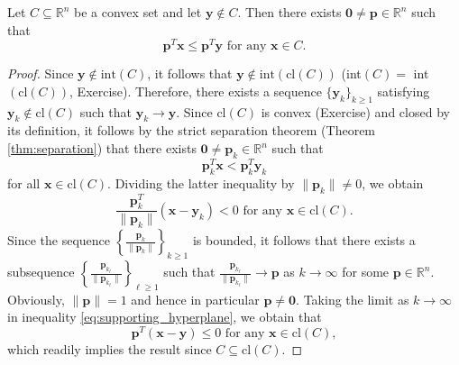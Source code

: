 \documentclass[10pt,a4paper]{article}
\begin{document}
\begin{theorem}\label{thm:supporting_hyperplane}
	Let $C \subseteq \mathbb{R}^n$ be a convex set and let $\mathbf{y} \notin C$. Then there exists $\mathbf{0} \neq \mathbf{p} \in \mathbb{R}^n$ such that
	\begin{equation*}
		\mathbf{p}^T \mathbf{x} \leq \mathbf{p}^T \mathbf{y} \text{ for any } \mathbf{x} \in C.
	\end{equation*}
\end{theorem}

\begin{proof}
	Since $\mathbf{y} \notin \text{int}(C)$, it follows that $\mathbf{y} \notin \text{int}(\text{cl}(C))$ (int$(C) = $ int$(\text{cl}(C))$, Exercise). Therefore, there exists a sequence $\{\mathbf{y}_k\}_{k \geq 1}$ satisfying $\mathbf{y}_k \notin \text{cl}(C)$
	such that $\mathbf{y}_k \to \mathbf{y}$. Since $\text{cl}(C)$ is convex (Exercise) and closed by its definition,
	it follows by the strict separation theorem (Theorem \ref{thm:separation}) that there exists $\mathbf{0} \neq \mathbf{p}_k \in \mathbb{R}^n$
	such that
	\begin{equation*}
		\mathbf{p}_k^T \mathbf{x} < \mathbf{p}_k^T \mathbf{y}_k
	\end{equation*}
	for all $\mathbf{x} \in \text{cl}(C)$. Dividing the latter inequality by $\|\mathbf{p}_k\| \neq 0$, we obtain
	\begin{equation}\label{eq:supporting_hyperplane}
		\frac{\mathbf{p}_k^T}{\|\mathbf{p}_k\|}(\mathbf{x} - \mathbf{y}_k) < 0 \text{ for any } \mathbf{x} \in \text{cl}(C).
	\end{equation}
	Since the sequence $\left\{ \frac{\mathbf{p}_k}{\|\mathbf{p}_k\|} \right\}_{k \geq 1}$ is bounded, it follows that there exists a subsequence $\left\{ \frac{\mathbf{p}_{k_\ell}}{\|\mathbf{p}_{k_\ell}\|} \right\}_{\ell \geq 1}$
	such that $\frac{\mathbf{p}_{k_\ell}}{\|\mathbf{p}_{k_\ell}\|} \to \mathbf{p}$ as $k \to \infty$ for some $\mathbf{p} \in \mathbb{R}^n$. Obviously, $\|\mathbf{p}\| = 1$ and hence in particular $\mathbf{p} \neq \mathbf{0}$. Taking the limit as $k \to \infty$ in inequality \eqref{eq:supporting_hyperplane}, we obtain that
	\begin{equation*}
		\mathbf{p}^T(\mathbf{x} - \mathbf{y}) \leq 0 \text{ for any } \mathbf{x} \in \text{cl}(C),
	\end{equation*}
	which readily implies the result since $C \subseteq \text{cl}(C)$.
\end{proof}
\end{document}
